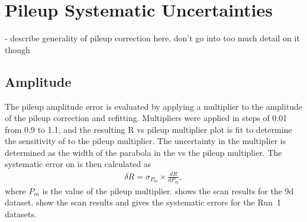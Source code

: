 
\graphicspath{{Body/Figures/Pileup/}{Body/Figures/Pileup/Amplitude/}{Body/Figures/Pileup/TimeShift/}{Body/Figures/Pileup/EnergyModel/}{Body/Figures/Pileup/TriplePileup/}{Body/Figures/Pileup/RateError/}}

\section{Pileup Systematic Uncertainties}


- describe generality of pileup correction here, don't go into too much detail on it though



\subsection{Amplitude}

The pileup amplitude error is evaluated by applying a multiplier to the amplitude of the pileup correction and refitting. Multipliers were applied in steps of 0.01 from 0.9 to 1.1, and the resulting R vs pileup multiplier plot is fit to determine the sensitivity of \R to the pileup multiplier. The uncertainty in the multiplier is determined as the width of the parabola in the \chisq vs the pileup multiplier. The systematic error on \R is then calculated as 
    \begin{align}
        \delta R = \sigma_{P_{m}} \times \frac{dR}{dP_{m}},
    \end{align}
where $P_{m}$ is the value of the pileup multiplier.  shows the scan results for the 9d dataset.  show the scan results and  gives the systematic errors for the Run~1 datasets.





